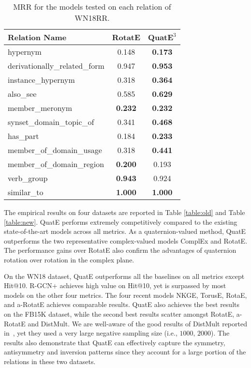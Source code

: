 \documentclass{article}
\begin{document}
\begin{wraptable}{r}{0.35\textwidth}
\vspace{-1em}
\tiny
\caption{MRR for the models tested on each relation of WN18RR.}
\begin{tabular}{|l|c|c|}
\hline
Relation Name                 & RotatE         & $\textbf{QuatE}^3$ \\ \hline
hypernym                      & 0.148          & \textbf{0.173} \\ \hline
derivationally\_related\_form & 0.947          & \textbf{0.953} \\ \hline
instance\_hypernym            & 0.318          & \textbf{0.364} \\ \hline
also\_see                     & 0.585          & \textbf{0.629} \\ \hline
member\_meronym               & \textbf{0.232} & \textbf{0.232} \\ \hline
synset\_domain\_topic\_of     & 0.341          & \textbf{0.468} \\ \hline
has\_part                     & 0.184          & \textbf{0.233} \\ \hline
member\_of\_domain\_usage     & 0.318          & \textbf{0.441} \\ \hline
member\_of\_domain\_region    & \textbf{0.200} & 0.193          \\ \hline
verb\_group                   & \textbf{0.943} & 0.924          \\ \hline
similar\_to                   & \textbf{1.000} & \textbf{1.000} \\ \hline
\end{tabular}
\label{each_rel}
\vspace{-1em}
\end{wraptable}
The empirical results on four datasets are reported in Table \ref{table:old} and Table \ref{table:new}. QuatE performs extremely competitively compared to the existing state-of-the-art models across all metrics. As a quaternion-valued method, QuatE outperforms the two representative complex-valued models ComplEx and RotatE. The performance gains over RotatE also confirm the advantages of quaternion rotation over rotation in the complex plane.


On the WN18 dataset, QuatE outperforms all the baselines on all metrics except Hit@10. R-GCN+ achieves high value on Hit@10, yet is surpassed by most models on the other four metrics. The four recent models NKGE, TorusE, RotaE, and a-RotatE achieves comparable results. QuatE also achieves the best results on the FB15K dataset, while the second best results scatter amongst RotatE, a-RotatE and DistMult. We are well-aware of the good results of DistMult reported in~\citep{kadlec2017knowledge}, yet they used a very large negative sampling size (i.e., $1000$, $2000$). The results also demonstrate that QuatE can effectively capture the symmetry, antisymmetry and inversion patterns since they account for a large portion of the relations in these two datasets.
\end{document}
